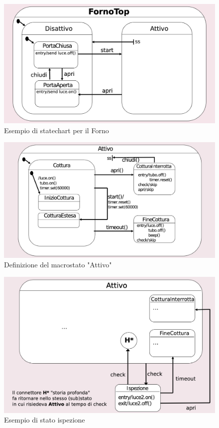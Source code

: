 \newpage

\begin{figure}[H]
    \centering
    \includegraphics[width=0.75\linewidth]{assets/UML/state/state5.png}
    \caption{Esempio di statechart per il Forno}
\end{figure}

\begin{figure}[H]
    \centering
    \includegraphics[width=0.75\linewidth]{assets/UML/state/state6.png}
    \caption{Definizione del macrostato "Attivo"}
\end{figure}

\begin{figure}[H]
    \centering
    \includegraphics[width=0.75\linewidth]{assets/UML/state/state7.png}
    \caption{Esempio di stato ispezione}
\end{figure}

